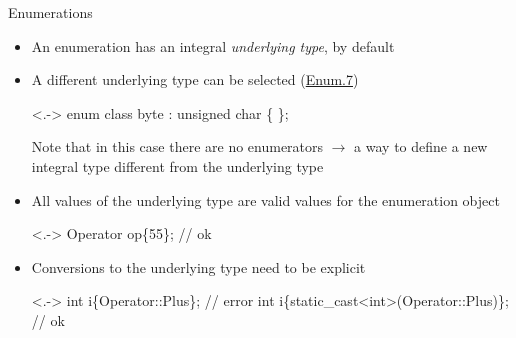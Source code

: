 \begin{frame}[fragile]{Enumerations \insertcontinuationtext}

  \begin{itemize}[<+->]
  \item An enumeration has an integral \textit{underlying type}, by default 
  \item A different underlying type can be selected (\href{https://isocpp.github.io/CppCoreGuidelines/CppCoreGuidelines#enum7-specify-the-underlying-type-of-an-enumeration-only-when-necessary}{Enum.7})
    \begin{codeblock}<.->{
enum class byte : unsigned char \{ \};}\end{codeblock}

    Note that in this case there are no enumerators $\rightarrow$ a way to define a
    new integral type different from the underlying type

  \item All values of the underlying type are valid values for the enumeration
    object

    \begin{codeblock}<.->
Operator op\{55\};  // ok\end{codeblock}

  \item Conversions to the underlying type need to be explicit

    \begin{codeblock}<.->
int i\{Operator::Plus\};                    // error
int i\{static_cast<int>(Operator::Plus)\};  // ok\end{codeblock}

  \end{itemize}

\end{frame}

